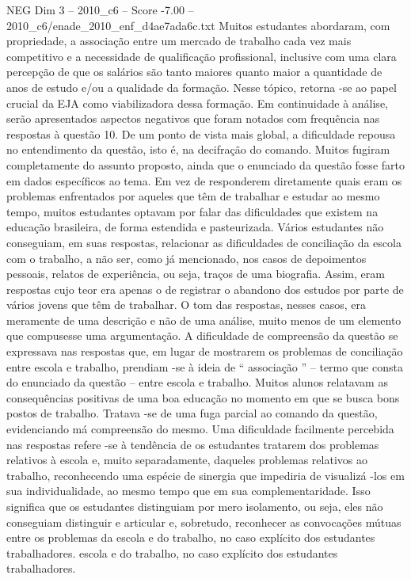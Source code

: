\begin{textsample}{NEG Dim 3 – 2010\_c6 – Score -7.00 – 2010\_c6/enade\_2010\_enf\_d4ae7ada6c.txt}
Muitos estudantes abordaram, com propriedade, a associação entre um mercado de trabalho cada vez mais competitivo e a necessidade de qualificação profissional, inclusive com uma clara percepção de que os salários são tanto maiores quanto maior a quantidade de anos de estudo e/ou a qualidade da formação.
Nesse tópico, retorna -se ao papel crucial da EJA como viabilizadora dessa formação.
Em continuidade à análise, serão apresentados aspectos negativos que foram notados com frequência nas respostas à questão 10.
De um ponto de vista mais global, a dificuldade repousa no entendimento da questão, isto é, na decifração do comando.
Muitos fugiram completamente do assunto proposto, ainda que o enunciado da questão fosse farto em dados específicos ao tema.
Em vez de responderem diretamente quais eram os problemas enfrentados por aqueles que têm de trabalhar e estudar ao mesmo tempo, muitos estudantes optavam por falar das dificuldades que existem na educação brasileira, de forma estendida e pasteurizada.
Vários estudantes não conseguiam, em suas respostas, relacionar as dificuldades de conciliação da escola com o trabalho, a não ser, como já mencionado, nos casos de depoimentos pessoais, relatos de experiência, ou seja, traços de uma biografia.
Assim, eram respostas cujo teor era apenas o de registrar o abandono dos estudos por parte de vários jovens que têm de trabalhar.
O tom das respostas, nesses casos, era meramente de uma descrição e não de uma análise, muito menos de um elemento que compusesse uma argumentação.
A dificuldade de compreensão da questão se expressava nas respostas que, em lugar de mostrarem os problemas de conciliação entre escola e trabalho, prendiam -se à ideia de “ associação ” – termo que consta do enunciado da questão – entre escola e trabalho.
Muitos alunos relatavam as consequências positivas de uma boa educação no momento em que se busca bons postos de trabalho.
Tratava -se de uma fuga parcial ao comando da questão, evidenciando má compreensão do mesmo.
Uma dificuldade facilmente percebida nas respostas refere -se à tendência de os estudantes tratarem dos problemas relativos à escola e, muito separadamente, daqueles problemas relativos ao trabalho, reconhecendo uma espécie de sinergia que impediria de visualizá -los em sua individualidade, ao mesmo tempo que em sua complementaridade.
Isso significa que os estudantes distinguiam por mero isolamento, ou seja, eles não conseguiam distinguir e articular e, sobretudo, reconhecer as convocações mútuas entre os problemas da escola e do trabalho, no caso explícito dos estudantes trabalhadores. escola e do trabalho, no caso explícito dos estudantes trabalhadores.

\end{textsample}
